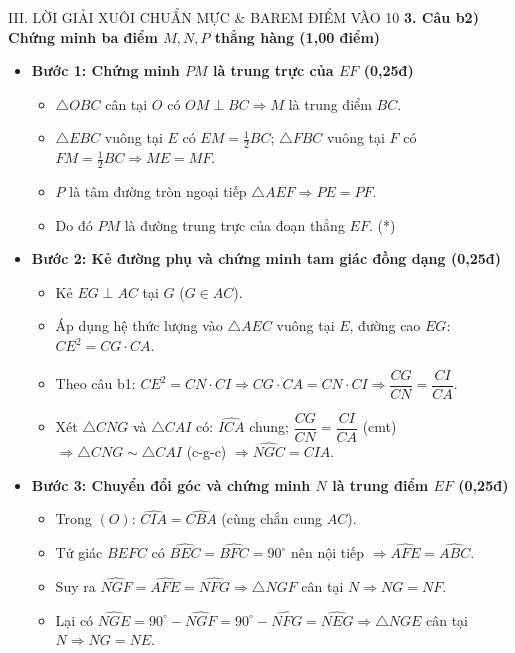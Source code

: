 \documentclass[11pt,a4paper]{article}
\begin{document}
\begin{solutionbox}{III. LỜI GIẢI XUÔI CHUẨN MỰC \& BAREM ĐIỂM VÀO 10}
\vspace{1.5mm}
\textbf{3. Câu b2) Chứng minh ba điểm $M, N, P$ thẳng hàng (1,00 điểm)}
\begin{itemize}[leftmargin=5mm]
    \item \textbf{Bước 1: Chứng minh $PM$ là trung trực của $EF$ (0,25đ)}
    \begin{itemize}
        \item $\triangle OBC$ cân tại $O$ có $OM \perp BC \Rightarrow M$ là trung điểm $BC$.
        \item $\triangle EBC$ vuông tại $E$ có $EM = \frac{1}{2}BC$; $\triangle FBC$ vuông tại $F$ có $FM = \frac{1}{2}BC \Rightarrow ME = MF$.
        \item $P$ là tâm đường tròn ngoại tiếp $\triangle AEF \Rightarrow PE = PF$.
        \item Do đó $PM$ là đường trung trực của đoạn thẳng $EF$. (*)
    \end{itemize}
    \item \textbf{Bước 2: Kẻ đường phụ và chứng minh tam giác đồng dạng (0,25đ)}
    \begin{itemize}
        \item Kẻ $EG \perp AC$ tại $G$ ($G \in AC$).
        \item Áp dụng hệ thức lượng vào $\triangle AEC$ vuông tại $E$, đường cao $EG$: $CE^2 = CG \cdot CA$.
        \item Theo câu b1: $CE^2 = CN \cdot CI \Rightarrow CG \cdot CA = CN \cdot CI \Rightarrow \dfrac{CG}{CN} = \dfrac{CI}{CA}$.
        \item Xét $\triangle CNG$ và $\triangle CAI$ có: $\widehat{ICA}$ chung; $\dfrac{CG}{CN} = \dfrac{CI}{CA}$ (cmt)
        $\Rightarrow \triangle CNG \sim \triangle CAI$ (c-g-c) $\Rightarrow \widehat{NGC} = \widehat{CIA}$.
    \end{itemize}
    \item \textbf{Bước 3: Chuyển đổi góc và chứng minh $N$ là trung điểm $EF$ (0,25đ)}
    \begin{itemize}
        \item Trong $(O)$: $\widehat{CIA} = \widehat{CBA}$ (cùng chắn cung $AC$).
        \item Tứ giác $BEFC$ có $\widehat{BEC}=\widehat{BFC}=90^\circ$ nên nội tiếp $\Rightarrow \widehat{AFE} = \widehat{ABC}$.
        \item Suy ra $\widehat{NGF} = \widehat{AFE} = \widehat{NFG} \Rightarrow \triangle NGF$ cân tại $N \Rightarrow NG = NF$.
        \item Lại có $\widehat{NGE} = 90^\circ - \widehat{NGF} = 90^\circ - \widehat{NFG} = \widehat{NEG} \Rightarrow \triangle NGE$ cân tại $N \Rightarrow NG = NE$.

\end{itemize}
\end{itemize}
\end{solutionbox}
\end{document}
